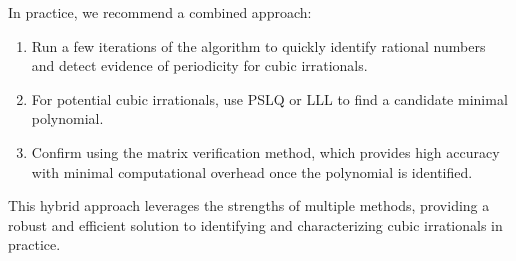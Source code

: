 In practice, we recommend a combined approach:
\begin{enumerate}
    \item Run a few iterations of the \HAPD{} algorithm to quickly identify rational numbers and detect evidence of periodicity for cubic irrationals.
    \item For potential cubic irrationals, use PSLQ or LLL to find a candidate minimal polynomial.
    \item Confirm using the matrix verification method, which provides high accuracy with minimal computational overhead once the polynomial is identified.
\end{enumerate}

This hybrid approach leverages the strengths of multiple methods, providing a robust and efficient solution to identifying and characterizing cubic irrationals in practice.
